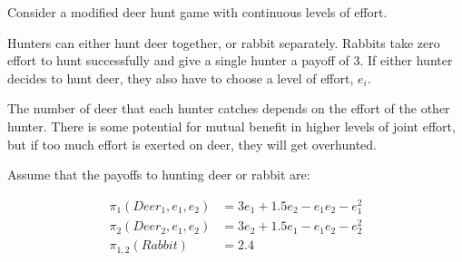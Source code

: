 \documentclass[addpoints]{exam}
\begin{document}
\begin{questions}
\begin{parts}
\end{parts}

\newpage

\question

Consider a modified deer hunt game with continuous levels of effort.

Hunters can either hunt deer together, or rabbit separately.
Rabbits take zero effort to hunt successfully and give a single hunter a payoff of 3.
If either hunter decides to hunt deer, they also have to choose a level of effort, $e_i$.

The number of deer that each hunter catches depends on the effort of the other hunter.
There is some potential for mutual benefit in higher levels of joint effort,
but if too much effort is exerted on deer, they will get overhunted.

Assume that the payoffs to hunting deer or rabbit are:

\begin{align*}
  \pi_1(Deer_1, e_1,e_2) & = 3e_1 + 1.5e_2 - e_1e_2 - e_1^2 \\
  \pi_2(Deer_2, e_1,e_2) & = 3e_2 + 1.5e_1 - e_1e_2 - e_2^2 \\
  \pi_{1,2}(Rabbit) & = 2.4
\end{align*}

\end{questions}
\end{document}
